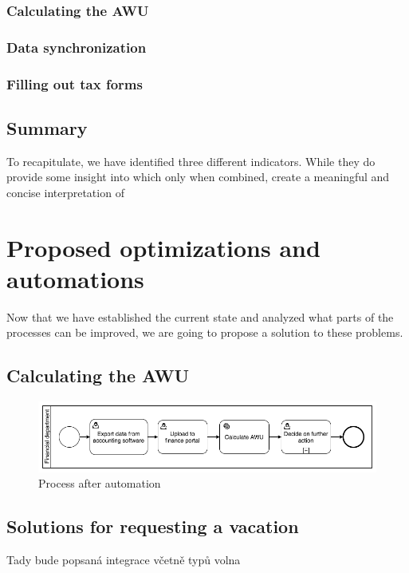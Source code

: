 \documentclass[12pt,oneside]{fithesis2}
\begin{document}
\subsection{Calculating the AWU}

\subsection{Data synchronization}

\subsection{Filling out tax forms}
\section{Summary}
To recapitulate, we have identified three different indicators. While they do provide some insight into which only when combined, create a meaningful and concise interpretation of 






\chapter{Proposed optimizations and automations}
Now that we have established the current state and analyzed what parts of the processes can be improved, we are going to propose a solution to these problems.
\section{Calculating the AWU}

\begin{figure}[ht]
    \centering
    \includegraphics[width=\textwidth]{after_automation.png}
    \caption{Process after automation}
    \label{fig:after_automation}
\end{figure}

\section{Solutions for requesting a vacation}
Tady bude popsaná integrace včetně typů volna
\end{document}

